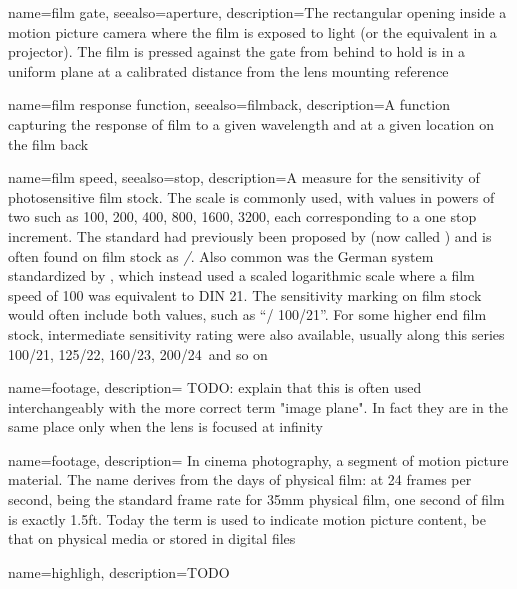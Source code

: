 {
	name={film gate},
	seealso={aperture},
	description={The rectangular opening inside a motion picture camera where the 
		film is exposed to light (or the equivalent in a projector).
		The film is pressed against the gate from behind to hold is in a uniform
		plane at a calibrated distance from the lens mounting reference}
}

{
	name={film response function},
	seealso={filmback},
	description={A function capturing the response of film to a given wavelength and at a
		given location on the film back}
}

{
	name={film speed},
	seealso={stop},
	description={A measure for the sensitivity of photosensitive film stock. 
		The  scale is commonly used, with values in powers of two such 
		as 100, 200, 400, 800, 1600, 3200, each corresponding to a one stop increment. 
		The standard had previously been proposed by 
		(now called ) and is often found on film stock as 
		\textsl{/}. 
		Also common was the German system standardized by , which instead 
		used a scaled logarithmic scale where a film speed of  100 was equivalent 
		to DIN 21\degree. 
		The sensitivity marking on film stock would often include both values, 
		such as ``/ 100/21\degree''. 
		For some higher end film stock, intermediate
		sensitivity rating were also available, usually along this series
		100/21\degree, 125/22\degree, 160/23\degree, 200/24\degree\ and so on}
}

{
	name=footage,
	description={
		TODO: explain that this is often used interchangeably with the more correct
		term "image plane". In fact they are in the same place only when the lens is
		focused at infinity
	}
}


{
	name=footage,
	description={
		In cinema photography, a segment of motion picture material. The name derives from
	    the days of physical film: at 24 frames per second, being the standard frame rate for
    	35\unit{\milli\meter} physical film, one second of film is exactly 1.5ft.
    	Today the term is used to indicate motion picture content, be that on physical
        media or stored in digital files}
}

{
	name=highligh,
	description={TODO}
}

